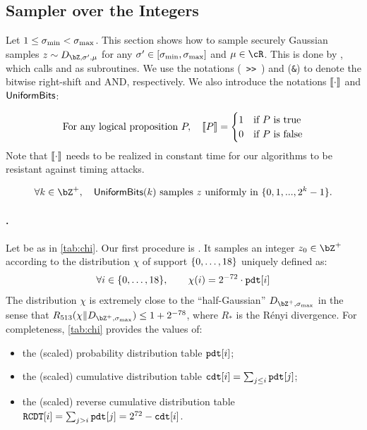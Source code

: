 \newpage

\subsection{Sampler over the Integers}\label{sec:spec:sign:integers}

\newcommand{\rightshift}{\ \texttt{>>}\ }

Let $1 \leq \sigma_{\min} < \sigma_{\max}$. This section shows how to sample securely Gaussian samples $z \sim D_{\bZ, \sigma', \mu}$ for any $\sigma' \in [\sigma_{\min}, \sigma_{\max}]$ and $\mu \in \cR$. This is done by \longsamplerz, which calls \longbasesampler and \longberexp as subroutines. We use the notations (\rightshift) and (\texttt{\&}) to denote the bitwise right-shift and AND, respectively. We also introduce the notations $\llbracket \cdot \rrbracket$ and $\textsf{UniformBits}$:

\begin{equation}
\text{For any logical proposition }P, \quad \llbracket P \rrbracket =
\begin{cases}
1 & \text{if $P$ is true} \\
0 & \text{if $P$ is false} \\
\end{cases}
\end{equation}
Note that $\llbracket \cdot \rrbracket$ needs to be realized in constant time for our algorithms to be resistant against timing attacks.

\begin{equation}\label{eq:uniform}
\forall k \in \bZ^+, \quad \uniform(k) \text{ samples $z$ uniformly in $\{0, 1, ..., 2^k - 1\}$.}
\end{equation}


\paragraph{\basesampler.} Let \pdt be as in \cref{tab:chi}. Our first procedure is \longbasesampler. It samples an integer $z_0 \in \bZ^+$ according to the distribution $\chi$ of support $\{0, \dots, 18\}$ uniquely defined as:
\begin{equation}\label{eq:chi}
\forall i \in \{0, \dots, 18\}, \qquad \chi(i) = 2^{-72} \cdot \texttt{pdt}[i]
\end{equation}
The distribution $\chi$ is extremely close to the ``half-Gaussian'' $D_{\bZ^+, \sigmax}$ in the sense that $R_{513}(\chi \| D_{\bZ^+, \sigmax}) \leq 1 + 2^{-78}$, where $R_*$ is the R\'enyi divergence. For completeness, \cref{tab:chi} provides the values of:
\begin{itemize}[nolistsep,noitemsep]
	\item the (scaled) probability distribution table $\texttt{pdt}[i]$;
	\item the (scaled) cumulative distribution table $\texttt{cdt}[i] = \sum_{j\leq i} \texttt{pdt}[j]$;
	\item the (scaled) reverse cumulative distribution table $\texttt{RCDT}[i] = \sum_{j > i} \texttt{pdt}[j] = 2^{72} - \texttt{cdt}[i]$.
\end{itemize}

